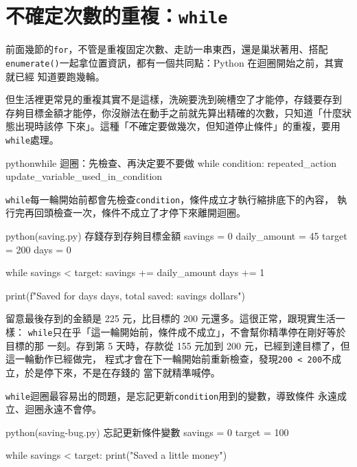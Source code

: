 \section{不確定次數的重複：\texttt{while}}
\label{sec:while-basics}

前面幾節的\texttt{for}，不管是重複固定次數、走訪一串東西，還是巢狀著用、搭配
\texttt{enumerate()}一起拿位置資訊，都有一個共同點：Python 在迴圈開始之前，其實就已經
知道要跑幾輪。

但生活裡更常見的重複其實不是這樣，洗碗要洗到碗槽空了才能停，存錢要存到
存夠目標金額才能停，你沒辦法在動手之前就先算出精確的次數，只知道「什麼狀態出現時該停
下來」。這種「不確定要做幾次，但知道停止條件」的重複，要用\texttt{while}處理。

\begin{code}{python}{while 迴圈：先檢查、再決定要不要做}
while condition:
    repeated_action
    update_variable_used_in_condition
\end{code}

\texttt{while}每一輪開始前都會先檢查\texttt{condition}，條件成立才執行縮排底下的內容，
執行完再回頭檢查一次，條件不成立了才停下來離開迴圈。

\begin{example}{python}{(saving.py) 存錢存到存夠目標金額}
savings = 0
daily_amount = 45
target = 200
days = 0

while savings < target:
    savings += daily_amount
    days += 1

print(f"Saved for {days} days, total saved: {savings} dollars")
\end{example}


留意最後存到的金額是 225 元，比目標的 200 元還多。這很正常，跟現實生活一樣：
\texttt{while}只在乎「這一輪開始前，條件成不成立」，不會幫你精準停在剛好等於目標的那
一刻。存到第 5 天時，存款從 155 元加到 200 元，已經到達目標了，但這一輪動作已經做完，
程式才會在下一輪開始前重新檢查，發現\texttt{200 < 200}不成立，於是停下來，不是在存錢的
當下就精準喊停。

\texttt{while}迴圈最容易出的問題，是忘記更新\texttt{condition}用到的變數，導致條件
永遠成立、迴圈永遠不會停。

\begin{example}{python}{(saving-bug.py) 忘記更新條件變數}
savings = 0
target = 100

while savings < target:
    print("Saved a little money")
\end{example}

